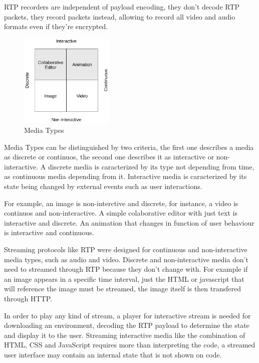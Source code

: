   \ac{RTP} recorders are independent of payload encoding, they don't decode \ac{RTP} packets, they record packets instead, allowing to record all video and audio formats even if they're encrypted.

\begin{figure}[H]
	\begin{center}
		\centering
		\includegraphics[width=0.4\textwidth]{figures/media_types.png}

	\caption{Media Types}
	\end{center}
\end{figure}

	Media Types can be distinguished by two criteria, the first one describes a media as discrete or continuos, the second one describes it as interactive or non-interactive. A discrete media is caracterized by its type not depending from time, as continuous media depending from it. Interactive media is caracterized by its state being changed by external events such as user interactions.

	For example, an image is non-interctive and discrete, for instance, a video is continuos and non-interactive. A simple colaborative editor with just text is interactive and discrete. An animation that changes in function of user behaviour is interactive and continuous.

	Streaming protocols like \ac {RTP} were designed for continuous and non-interactive media types, such as audio and video. Discrete and non-interactive media don't need to streamed through \ac{RTP} because they don't change with. For example if an image appears in a specific time interval, just the \ac{HTML} or javascript that will reference the image must be streamed, the image itself is then transfered through \ac{HTTP}.

	In order to play any kind of stream, a player for interactive stream is needed for downloading an environment, decoding the \ac{RTP} payload to determine the state and display it to the user. Streaming interactive media like the combination of \ac{HTML}, \ac{CSS} and JavaScript requires more than interpreting the code, a streamed user interface may contain an internal state that is not shown on code.

